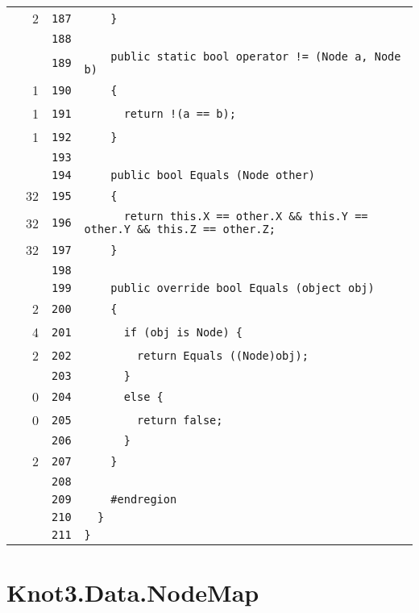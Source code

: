 \documentclass[a4paper,10pt]{article}
\begin{document}
\begin{longtable}[l]{lrrl}
\cellcolor{green} & 2 & \verb~187~ & \verb~    }~\\
\cellcolor{gray} &  & \verb~188~ & \verb~~\\
\cellcolor{gray} &  & \verb~189~ & \verb~    public static bool operator != (Node a, Node b)~\\
\cellcolor{green} & 1 & \verb~190~ & \verb~    {~\\
\cellcolor{green} & 1 & \verb~191~ & \verb~      return !(a == b);~\\
\cellcolor{green} & 1 & \verb~192~ & \verb~    }~\\
\cellcolor{gray} &  & \verb~193~ & \verb~~\\
\cellcolor{gray} &  & \verb~194~ & \verb~    public bool Equals (Node other)~\\
\cellcolor{green} & 32 & \verb~195~ & \verb~    {~\\
\cellcolor{green} & 32 & \verb~196~ & \verb~      return this.X == other.X && this.Y == other.Y && this.Z == other.Z;~\\
\cellcolor{green} & 32 & \verb~197~ & \verb~    }~\\
\cellcolor{gray} &  & \verb~198~ & \verb~~\\
\cellcolor{gray} &  & \verb~199~ & \verb~    public override bool Equals (object obj)~\\
\cellcolor{green} & 2 & \verb~200~ & \verb~    {~\\
\cellcolor{green} & 4 & \verb~201~ & \verb~      if (obj is Node) {~\\
\cellcolor{green} & 2 & \verb~202~ & \verb~        return Equals ((Node)obj);~\\
\cellcolor{gray} &  & \verb~203~ & \verb~      }~\\
\cellcolor{red} & 0 & \verb~204~ & \verb~      else {~\\
\cellcolor{red} & 0 & \verb~205~ & \verb~        return false;~\\
\cellcolor{gray} &  & \verb~206~ & \verb~      }~\\
\cellcolor{green} & 2 & \verb~207~ & \verb~    }~\\
\cellcolor{gray} &  & \verb~208~ & \verb~~\\
\cellcolor{gray} &  & \verb~209~ & \verb~    #endregion~\\
\cellcolor{gray} &  & \verb~210~ & \verb~  }~\\
\cellcolor{gray} &  & \verb~211~ & \verb~}~\\
\end{longtable}
\newpage
\section{Knot3.Data.NodeMap}
\end{document}
